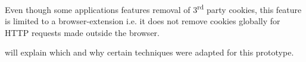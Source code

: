 \documentclass[main.tex]{subfiles}
\begin{document}
Even though some applications features removal of 3\textsuperscript{rd} party cookies, this feature is limited to a browser-extension i.e. it does not remove cookies globally for HTTP requests made outside the browser.

 will explain which and why certain techniques were adapted for this prototype.

\end{document}
